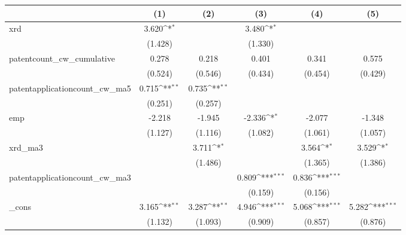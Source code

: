 {
\def\sym#1{\ifmmode^{#1}\else\(^{#1}\)\fi}
\begin{tabular}{l*{5}{c}}
\hline\hline
            &\multicolumn{1}{c}{(1)}         &\multicolumn{1}{c}{(2)}         &\multicolumn{1}{c}{(3)}         &\multicolumn{1}{c}{(4)}         &\multicolumn{1}{c}{(5)}         \\
\hline
xrd         &       3.620\sym{*}  &                     &       3.480\sym{*}  &                     &                     \\
            &     (1.428)         &                     &     (1.330)         &                     &                     \\
[1em]
patentcount\_cw\_cumulative&       0.278         &       0.218         &       0.401         &       0.341         &       0.575         \\
            &     (0.524)         &     (0.546)         &     (0.434)         &     (0.454)         &     (0.429)         \\
[1em]
patentapplicationcount\_cw\_ma5&       0.715\sym{**} &       0.735\sym{**} &                     &                     &                     \\
            &     (0.251)         &     (0.257)         &                     &                     &                     \\
[1em]
emp         &      -2.218         &      -1.945         &      -2.336\sym{*}  &      -2.077         &      -1.348         \\
            &     (1.127)         &     (1.116)         &     (1.082)         &     (1.061)         &     (1.057)         \\
[1em]
xrd\_ma3     &                     &       3.711\sym{*}  &                     &       3.564\sym{*}  &       3.529\sym{*}  \\
            &                     &     (1.486)         &                     &     (1.365)         &     (1.386)         \\
[1em]
patentapplicationcount\_cw\_ma3&                     &                     &       0.809\sym{***}&       0.836\sym{***}&                     \\
            &                     &                     &     (0.159)         &     (0.156)         &                     \\
[1em]
\_cons      &       3.165\sym{**} &       3.287\sym{**} &       4.946\sym{***}&       5.068\sym{***}&       5.282\sym{***}\\
            &     (1.132)         &     (1.093)         &     (0.909)         &     (0.857)         &     (0.876)         \\

\end{tabular}}
